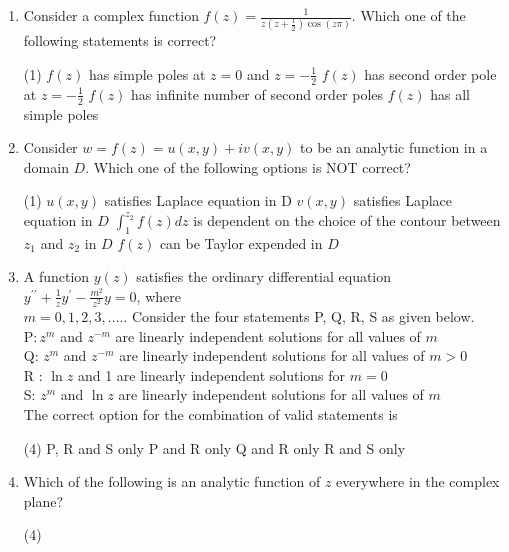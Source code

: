 \begin{note}
\begin{enumerate}[label=\color{ocre}\textbf{\arabic*.}]
	\item Consider a complex function $f(z)=\frac{1}{z\left(z+\frac{1}{2}\right) \cos (z \pi)}$. Which one of the following statements is correct?
	{}
	\begin{tasks}(1)
		\task[\textbf{A.}] $f(z)$ has simple poles at $z=0$ and $z=-\frac{1}{2}$
		\task[\textbf{B.}] $f(z)$ has second order pole at $z=-\frac{1}{2}$
		\task[\textbf{C.}] $f(z)$ has infinite number of second order poles
		\task[\textbf{D.}] $f(z)$ has all simple poles
	\end{tasks}
	\item  Consider $w=f(z)=u(x, y)+i v(x, y)$ to be an analytic function in a domain $D$. Which one of the following options is NOT correct?
	{}
	\begin{tasks}(1)
		\task[\textbf{A.}] $u(x, y)$ satisfies Laplace equation in D
		\task[\textbf{B.}]  $v(x, y)$ satisfies Laplace equation in $D$
		\task[\textbf{C.}] $\int_{1}^{z_{2}} f(z) d z$ is dependent on the choice of the contour between $z_{1}$ and $z_{2}$ in $D$
		\task[\textbf{D.}]  $f(z)$ can be Taylor expended in $D$
	\end{tasks}
	\item A function $y(z)$ satisfies the ordinary differential equation $y^{\prime \prime}+\frac{1}{z} y^{\prime}-\frac{m^{2}}{z^{2}} y=0$, where\\
	$m=0,1,2,3, \ldots . .$ Consider the four statements P, Q, R, S as given below.\\
	$\mathrm{P}: z^{m}$ and $z^{-m}$ are linearly independent solutions for all values of $m$\\
	Q: $z^{m}$ and $z^{-m}$ are linearly independent solutions for all values of $m>0$\\
	$\mathrm{R}$ : $\ln z$ and 1 are linearly independent solutions for $m=0$\\
	S: $z^{m}$ and $\ln z$ are linearly independent solutions for all values of $m$\\
	The correct option for the combination of valid statements is
	{}
	\begin{tasks}(4)
		\task[\textbf{A.}] P, R and S only
		\task[\textbf{B.}]  P and R only
		\task[\textbf{C.}] $\mathrm{Q}$ and $\mathrm{R}$ only
		\task[\textbf{D.}] $\mathrm{R}$ and $\mathrm{S}$ only
	\end{tasks}
	\item  Which of the following is an analytic function of $z$ everywhere in the complex plane?
	{}
	\begin{tasks}(4)

\end{tasks}
\end{enumerate}
\end{note}
